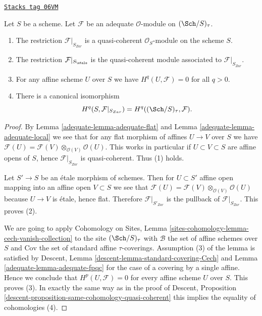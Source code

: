 \begin{lemma}
\label{adequate-lemma-same-cohomology-adequate}
\href{https://stacks.math.columbia.edu/tag/06VM}{\texttt{Stacks tag 06VM}}

Let $S$ be a scheme. Let $\mathcal{F}$ be an adequate
$\mathcal{O}$-module on $(\Sch/S)_\tau$.
\begin{enumerate}
\item The restriction $\mathcal{F}|_{S_{Zar}}$ is a quasi-coherent
$\mathcal{O}_S$-module on the scheme $S$.
\item The restriction $\mathcal{F}|_{S_\etale}$ is the
quasi-coherent module associated to $\mathcal{F}|_{S_{Zar}}$.
\item For any affine scheme $U$ over $S$ we have $H^q(U, \mathcal{F}) = 0$
for all $q > 0$.
\item There is a canonical isomorphism
$$
H^q(S, \mathcal{F}|_{S_{Zar}}) =
H^q((\Sch/S)_\tau, \mathcal{F}).
$$
\end{enumerate}
\end{lemma}

\begin{proof}

By
Lemma \ref{adequate-lemma-adequate-flat}
and
Lemma \ref{adequate-lemma-adequate-local}
we see that for any flat morphism of affines $U \to V$ over $S$
we have
$\mathcal{F}(U) = \mathcal{F}(V) \otimes_{\mathcal{O}(V)} \mathcal{O}(U)$.
This works in particular if $U \subset V \subset S$ are affine opens of
$S$, hence $\mathcal{F}|_{S_{Zar}}$ is quasi-coherent.
Thus (1) holds.

\medskip\noindent
Let $S' \to S$ be an \'etale morphism of schemes.
Then for $U \subset S'$ affine open mapping into an affine open
$V \subset S$ we see that
$\mathcal{F}(U) = \mathcal{F}(V) \otimes_{\mathcal{O}(V)} \mathcal{O}(U)$
because $U \to V$ is \'etale, hence flat. Therefore
$\mathcal{F}|_{S'_{Zar}}$ is the pullback of $\mathcal{F}|_{S_{Zar}}$.
This proves (2).

\medskip\noindent
We are going to apply
Cohomology on Sites,
Lemma \ref{sites-cohomology-lemma-cech-vanish-collection}
to the site $(\Sch/S)_\tau$ with
$\mathcal{B}$ the set of affine schemes over $S$ and
$\text{Cov}$ the set of standard affine $\tau$-coverings.
Assumption (3) of the lemma is satisfied by
Descent, Lemma \ref{descent-lemma-standard-covering-Cech}
and
Lemma \ref{adequate-lemma-adequate-fpqc}
for the case of a covering by a single affine.
Hence we conclude that $H^p(U, \mathcal{F}) = 0$ for every
affine scheme $U$ over $S$. This proves (3).
In exactly the same way as in the proof of
Descent, Proposition \ref{descent-proposition-same-cohomology-quasi-coherent}
this implies the equality of cohomologies (4).
\end{proof}

